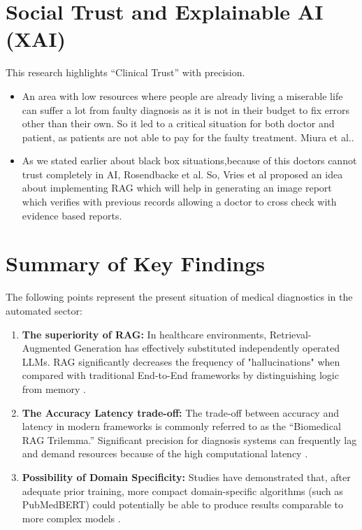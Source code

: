 \section{ Social Trust and Explainable AI (XAI)
}
This research highlights ``Clinical Trust'' with precision. \begin{itemize} \item An area with low resources where people are already living a miserable life can suffer a lot from faulty diagnosis as it is not in their budget to fix errors other than their own. So it led to a critical situation for both doctor and patient, as patients are not able to pay for the faulty treatment. Miura et al.\cite{Miura2021}. \item As we stated  earlier about black box situations,because of this doctors cannot trust completely in AI, Rosendbacke et al.\cite{Rosenbacke2024} So, Vries et al \cite{DeVries2023} proposed an idea about implementing RAG which will help in generating an image report which verifies with previous records allowing a doctor to cross check with evidence based reports.
 \end{itemize}

\section{Summary of Key Findings}
The following points represent the present situation of medical diagnostics in the automated sector: \begin{enumerate} \item \textbf{The superiority of RAG:} In healthcare environments, Retrieval-Augmented Generation has effectively substituted independently operated LLMs. RAG significantly decreases the frequency of "hallucinations" when compared with traditional End-to-End frameworks by distinguishing logic from memory \cite{Lewis2020,AboElEnen2025}.  \item \textbf{The Accuracy Latency trade-off:} The trade-off between accuracy and latency in modern frameworks is commonly referred to as the ``Biomedical RAG Trilemma.'' Significant precision for diagnosis systems can frequently lag and demand resources because of the high computational latency \cite{He2025,Zhao2026}. \item \textbf{Possibility of Domain Specificity:} Studies have demonstrated that, after adequate prior training, more compact domain-specific algorithms (such as PubMedBERT) could potentially be able to produce results comparable to more complex models\cite{Gu2021} . \end{enumerate}


